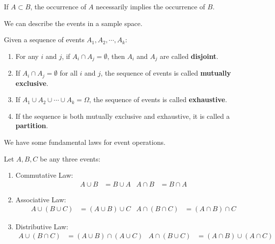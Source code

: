 \documentclass{huhtakm-template-book-v2}
\begin{document}
    \begin{rem}
        If $A\subset B$, the occurrence of $A$ necessarily implies the occurrence of $B$.
    \end{rem}
    We can describe the events in a sample space.
    \begin{defn}
        Given a sequence of events $A_{1},A_{2},\cdots,A_{k}$:
        \begin{enumerate}
            \item For any $i$ and $j$, if $A_{i}\cap A_{j} = \emptyset$, then $A_{i}$ and $A_{j}$ are called \textbf{disjoint}.
            \item If $A_{i}\cap A_{j} = \emptyset$ for all $i$ and $j$, the sequence of events is called \textbf{mutually exclusive}.
            \item If $A_{1}\cup A_{2}\cup\cdots\cup A_{k} = \Omega$, the sequence of events is called \textbf{exhaustive}.
            \item If the sequence is both mutually exclusive and exhaustive, it is called a \textbf{partition}.
        \end{enumerate}
    \end{defn}
    We have some fundamental laws for event operations.
    \begin{thm}
        Let $A,B,C$ be any three events:
        \begin{enumerate}
            \item Commutative Law:
            \begin{align*}
                A\cup B &= B\cup A & A\cap B &= B\cap A
            \end{align*}
            \item Associative Law:
            \begin{align*}
                A\cup(B\cup C) &= (A\cup B)\cup C & A\cap(B\cap C) &= (A\cap B)\cap C
            \end{align*}
            \item Distributive Law:
            \begin{align*}
                A\cup(B\cap C) &= (A\cup B)\cap(A\cup C) & A\cap(B\cup C) &= (A\cap B)\cup(A\cap C)
            \end{align*}
        \end{enumerate}
    \end{thm}
    \newpage
\end{document}
